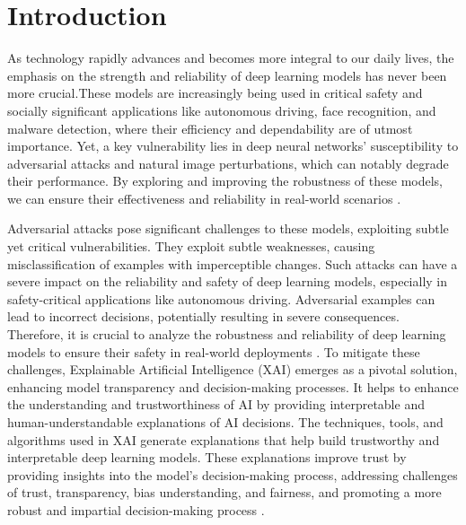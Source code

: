 \documentclass[10pt, conference, a4paper, final]{IEEEtran}
\begin{document}
\section{Introduction}

As technology rapidly advances and becomes more integral to our daily lives, the emphasis on the strength and reliability of deep learning models has never been more crucial.These models are increasingly being used in critical safety and socially significant applications like autonomous driving, face recognition, and malware detection, where their efficiency and dependability are of utmost importance. Yet, a key vulnerability lies in deep neural networks' susceptibility to adversarial attacks and natural image perturbations, which can notably degrade their performance. By exploring and improving the robustness of these models, we can ensure their effectiveness and reliability in real-world scenarios \cite {Numair, Aleksandar}.

Adversarial attacks pose significant challenges to these models, exploiting subtle yet critical vulnerabilities. They exploit subtle weaknesses, causing misclassification of examples with imperceptible changes. Such attacks can have a severe impact on the reliability and safety of deep learning models, especially in safety-critical applications like autonomous driving. Adversarial examples can lead to incorrect decisions, potentially resulting in severe consequences. Therefore, it is crucial to analyze the robustness and reliability of deep learning models to ensure their safety in real-world deployments \cite {Samuel, Muhammad}.  To mitigate these challenges, Explainable Artificial Intelligence (XAI) emerges as a pivotal solution, enhancing model transparency and decision-making processes. It helps to enhance the understanding and trustworthiness of AI by providing interpretable and human-understandable explanations of AI decisions. The techniques, tools, and algorithms used in XAI generate explanations that help build trustworthy and interpretable deep learning models. These explanations improve trust by providing insights into the model's decision-making process, addressing challenges of trust, transparency, bias understanding, and fairness, and promoting a more robust and impartial decision-making process \cite {Mohammed, Aha, Tamer}. 
\end{document}
